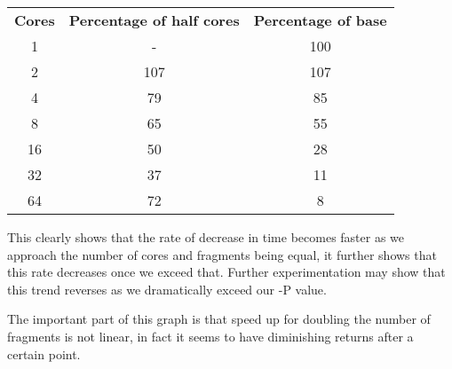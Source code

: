 \documentclass{report}
\begin{document}
\begin{table}[]
\centering
\begin{tabular}{ccc}
\multicolumn{1}{l}{\textbf{Cores}} & \multicolumn{1}{l}{\textbf{Percentage of half cores}} & \textbf{Percentage of base} \\
1                                  & -                                                     & 100                         \\
2                                  & 107                                                   & 107                         \\
4                                  & 79                                                    & 85                          \\
8                                  & 65                                                    & 55                          \\
16                                 & 50                                                    & 28                          \\
32                                 & 37                                                    & 11                          \\
64                                 & 72                                                    & 8                          
\end{tabular}
\end{table}
This clearly shows that the rate of decrease in time becomes faster as we approach the number of cores and fragments being equal, it further shows that this rate decreases once we exceed that. Further experimentation may show that this trend reverses as we dramatically exceed our -P value. 
\newline
{}
\newline
The important part of this graph is that speed up for doubling the number of fragments is not linear, in fact it seems to have diminishing returns after a certain point. 
\end{document}
